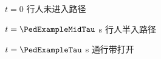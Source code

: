 \begin{subfigure}[b]{0.32\textwidth}
  \centering
  \caption{$t=0$ 行人未进入路径}
\end{subfigure}\hfill
\begin{subfigure}[b]{0.32\textwidth}
  \centering
  \caption{$t=\PedExampleMidTau$ s 行人半入路径}
\end{subfigure}\hfill
\begin{subfigure}[b]{0.32\textwidth}
  \centering
  \caption{$t=\PedExampleTau$ s 通行带打开}
\end{subfigure}
